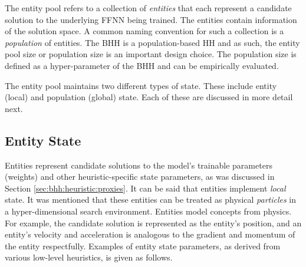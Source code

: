 The entity pool refers to a collection of \textit{entities} that each represent a candidate solution to the underlying \acs{FFNN} being trained. The entities contain information of the solution space. A common naming convention for such a collection is a \textit{population} of entities. The \acs{BHH} is a population-based \acs{HH} and as such, the entity pool size or population size is an important design choice. The population size is defined as a hyper-parameter of the \acs{BHH} and can be empirically evaluated.

The entity pool maintains two different types of state. These include entity (local) and population (global) state. Each of these are discussed in more detail next.

\subsection{Entity State}\label{sec:bhh:entity_pool:entity_state}

Entities represent candidate solutions to the model's trainable parameters (weights) and other heuristic-specific state parameters, as was discussed in Section \ref{sec:bhh:heuristic:proxies}. It can be said that entities implement \textit{local} state. It was mentioned that these entities can be treated as physical \textit{particles} in a hyper-dimensional search environment. Entities model concepts from physics. For example, the candidate solution is represented as the entity's position, and an entity's velocity and acceleration is analogous to the gradient and momentum of the entity respectfully. Examples of entity state parameters, as derived from various low-level heuristics, is given as follows.

